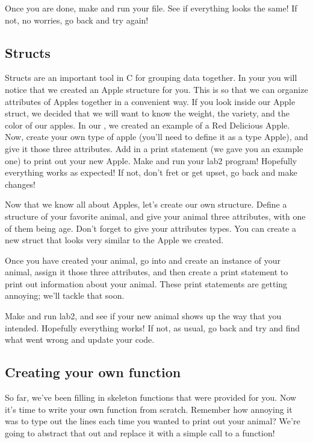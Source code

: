 \documentclass{tufte-handout}
\begin{document}
Once you are done, make and run your file.  See if everything looks the same!  If not, no worries, go back and try again!


\subsection{Structs}


Structs are an important tool in C for grouping data together.  In
your  you will notice that we created an Apple structure for you.  This is so that we can organize attributes of Apples together in a convenient way.  If you look inside our Apple struct, we decided that we will want to know the weight, the variety, and the color of our apples.  In our , we created an example of a Red Delicious Apple.  Now, create your own type of apple (you'll need to define it as a type Apple), and give it those three attributes.  Add in a print statement (we gave you an example one) to print out your new Apple.  Make and run your lab2 program!  Hopefully everything works as expected!  If not, don't fret or get upset, go back and make changes!


Now that we know all about Apples, let's create our own structure.  Define a structure of your favorite animal, and give your animal three attributes, with one of them being age. Don't forget to give your attributes types. You can create a new struct that looks very similar to the Apple we created.

Once you have created your animal, go into  and create an instance of your animal, assign it those three attributes, and then create a print statement to print out information about your animal.  These print statements are getting annoying; we'll tackle that soon.

Make and run lab2, and see if your new animal shows up the way that you intended.  Hopefully everything works!  If not, as usual, go back and try and find what went wrong and update your code. 



\subsection{Creating your own function}
So far, we've been filling in skeleton functions that were provided for you. Now it's time to write your own function from scratch.  Remember how annoying it was to type out the  lines each time you wanted to print out your animal?  We're going to abstract that out and replace it with a simple call to a function! 
\end{document}
